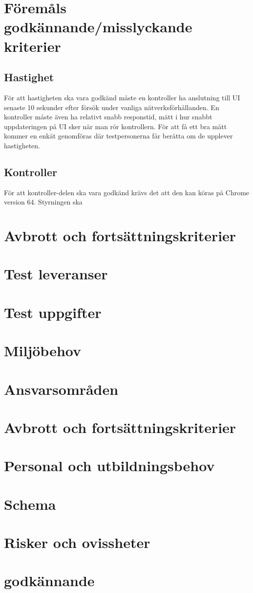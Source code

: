 \documentclass[10pt]{article}
\begin{document}
	

\section{Föremåls godkännande/misslyckande kriterier}
	\subsection{Hastighet}
		För att hastigheten ska vara godkänd måste en kontroller ha anslutning till UI senaste 10 sekunder efter försök under vanliga nätverksförhållanden. En kontroller måste även ha relativt snabb responstid, mätt i hur snabbt uppdateringen på UI sker när man rör kontrollern. För att få ett bra mått kommer en enkät genomföras där testpersonerna får berätta om de upplever hastigheten.
	\subsection{Kontroller}
		För att kontroller-delen ska vara godkänd krävs det att den kan köras på Chrome version 64. Styrningen ska 
\section{Avbrott och fortsättningskriterier}
\section{Test leveranser}
\section{Test uppgifter}
\section{Miljöbehov}
\section{Ansvarsområden}
\section{Avbrott och fortsättningskriterier}
\section{Personal och utbildningsbehov}
\section{Schema}
\section{Risker och ovissheter}
\section{godkännande}
\end{document}
